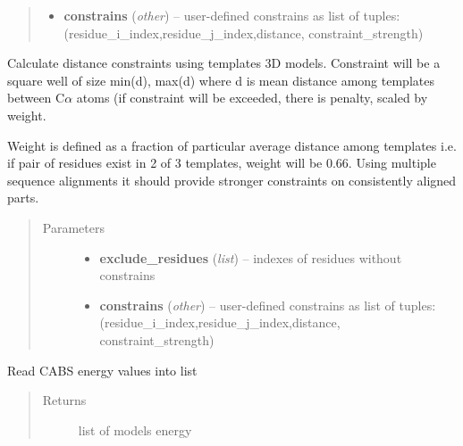 \documentclass[letterpaper,10pt,english]{sphinxmanual}
\begin{document}
\begin{fulllineitems}
\begin{fulllineitems}
\begin{quote}
\begin{description}
\begin{itemize}
\item {} 
\textbf{constrains} (\emph{other}) -- user-defined constrains as list of tuples: (residue\_i\_index,residue\_j\_index,distance, constraint\_strength)

\end{itemize}

\end{description}\end{quote}

\end{fulllineitems}


\begin{fulllineitems}
\label{api:pycabs.CABS.generateConstraintsOld}
Calculate distance constraints using templates 3D models. Constraint will be a square well of size min(d), max(d) where d is mean distance among templates between C\(\alpha\) atoms (if constraint will be exceeded, there is penalty, scaled by weight.

Weight is defined as a fraction of particular average distance among templates i.e. if pair of residues exist in 2 of 3 templates, weight will be 0.66. Using multiple sequence alignments it should provide stronger constraints on consistently aligned parts.
\begin{quote}\begin{description}
\item[{Parameters}] \leavevmode\begin{itemize}
\item {} 
\textbf{exclude\_residues} (\emph{list}) -- indexes of residues without constrains

\item {} 
\textbf{constrains} (\emph{other}) -- user-defined constrains as list of tuples: (residue\_i\_index,residue\_j\_index,distance, constraint\_strength)

\end{itemize}

\end{description}\end{quote}

\end{fulllineitems}


\begin{fulllineitems}
\label{api:pycabs.CABS.getEnergy}
Read CABS energy values into list
\begin{quote}\begin{description}
\item[{Returns}] \leavevmode
list of models energy


\end{description}
\end{quote}
\end{fulllineitems}
\end{fulllineitems}
\end{document}
